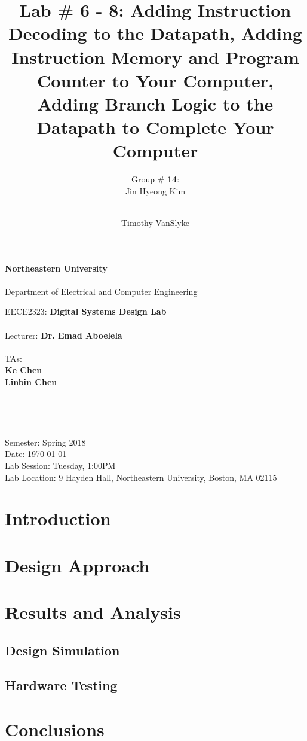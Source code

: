 \documentclass[12pt, letterpaper]{article}
\title{Lab \# 6 - 8: \textbf{Adding Instruction Decoding to the Datapath}, \textbf{Adding Instruction Memory and Program Counter to Your Computer}, \textbf{Adding Branch Logic to the Datapath to Complete Your Computer}}
\author{Group \# \textbf{14}:\\ Jin Hyeong Kim \and\\ Timothy VanSlyke}
\begin{document}
\begin{titlepage}
	\begin{center}
		{\Large
			\textbf{Northeastern University}\\
			~\\
			Department of Electrical and Computer Engineering\\ 
		}

		\vfill

		{\large
			EECE2323: \textbf{Digital Systems Design Lab}\\
			~\\
			Lecturer: \textbf{Dr. Emad Aboelela}\\
			~\\
			TAs:\\
			\textbf{Ke Chen}\\
			\textbf{Linbin Chen}\\
		}
	
		\vfill

		{\Large \thetitle}\\
	
		\vfill

		{\large \theauthor}\\

		\vfill

		{\large
			Semester: Spring 2018\\
			Date: \today\\
			Lab Session: Tuesday, 1:00PM\\ 
			Lab Location: 9 Hayden Hall, Northeastern University, Boston, MA 02115\\
		}

	\end{center}
\end{titlepage}

\tableofcontents


\newpage
\section{Introduction}


\newpage
\section{Design Approach}


\newpage
\section{Results and Analysis}

\subsection{Design Simulation}

\subsection{Hardware Testing}


\newpage
\section{Conclusions}


\newpage
\appendix
\appendixpage
\addappheadtotoc 
\end{document}
